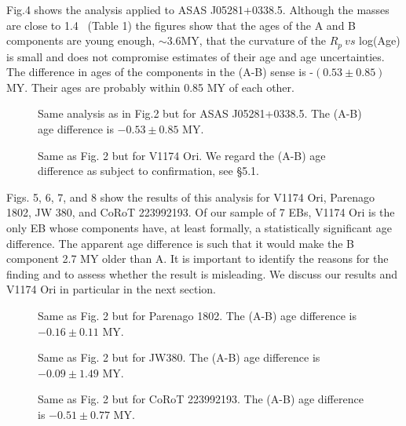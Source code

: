 \documentclass[12pt,preprint]{aastex6}
\begin{document}
 
Fig.4  shows the  analysis applied to ASAS J05281+0338.5.
Although the masses are close to 1.4 \msun ~(Table 1) 
the figures show that the ages of the A and B components are 
young enough, $\sim 3.6$MY, that the curvature of the $R_p~vs$ 
log(Age) is small and does not compromise estimates of their
age and age uncertainties. The difference in ages of the
components in the (A-B) sense is -$(0.53\pm 0.85)$MY. 
Their ages are probably within 0.85 MY of each other.
\begin{figure}
\centering
{}
\caption{Same analysis as in Fig.2 but for ASAS J05281+0338.5.  
The (A-B) age difference is $-0.53\pm0.85$ MY.}
\end{figure}


\begin{figure}
\centering
{}
\caption{Same as Fig. 2 but for V1174 Ori.  We regard 
the (A-B) age difference
as subject to confirmation, see \S 5.1.}
\end{figure}
Figs. 5, 6, 7, and 8 show the results of this analysis
for V1174 Ori, Parenago 1802, JW 380, and CoRoT 223992193.
Of our sample of 7 EBs,  V1174 Ori is the only EB  
whose components have, at least formally, a statistically 
significant age difference. The apparent age difference  
is such that it would make the B component 2.7 MY
older than A.   It is important to 
identify the reasons for the finding and to assess whether
the result is misleading.  We discuss our results and 
V1174 Ori in particular in the next section.


\begin{figure}
\centering
{}
\caption{Same as Fig. 2 but for Parenago 1802. The (A-B) 
age difference is $-0.16\pm 0.11$ MY. }
\end{figure}


\begin{figure}
\centering
{}
\caption{Same as Fig. 2 but for JW380.  The (A-B) age difference is
$-0.09\pm 1.49$ MY.}
\end{figure}

\begin{figure}
\centering
{}
\caption{Same as Fig. 2 but for CoRoT 223992193.   
The (A-B) age difference is $-0.51\pm 0.77$ MY. }
\end{figure}
\end{document}

